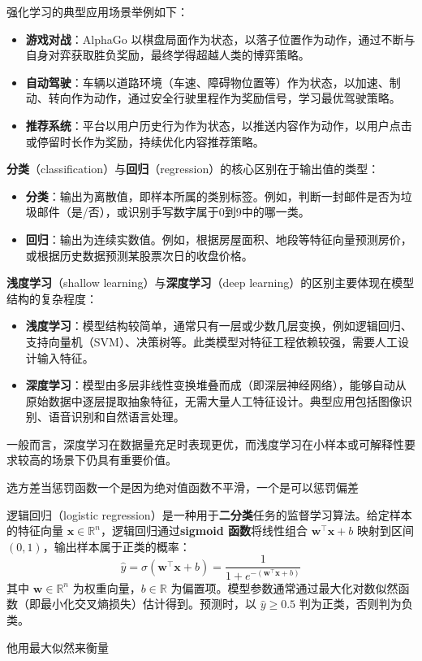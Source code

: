 \begin{note}
强化学习的典型应用场景举例如下：
\begin{itemize}
    \item \textbf{游戏对战}：AlphaGo 以棋盘局面作为状态，以落子位置作为动作，通过不断与自身对弈获取胜负奖励，最终学得超越人类的博弈策略。
    \item \textbf{自动驾驶}：车辆以道路环境（车速、障碍物位置等）作为状态，以加速、制动、转向作为动作，通过安全行驶里程作为奖励信号，学习最优驾驶策略。
    \item \textbf{推荐系统}：平台以用户历史行为作为状态，以推送内容作为动作，以用户点击或停留时长作为奖励，持续优化内容推荐策略。
\end{itemize}
\end{note}
\begin{note}
\textbf{分类}（classification）与\textbf{回归}（regression）的核心区别在于输出值的类型：
\begin{itemize}
    \item \textbf{分类}：输出为离散值，即样本所属的类别标签。例如，判断一封邮件是否为垃圾邮件（是/否），或识别手写数字属于0到9中的哪一类。
    \item \textbf{回归}：输出为连续实数值。例如，根据房屋面积、地段等特征向量预测房价，或根据历史数据预测某股票次日的收盘价格。
\end{itemize}
\end{note}

\begin{note}
\textbf{浅度学习}（shallow learning）与\textbf{深度学习}（deep learning）的区别主要体现在模型结构的复杂程度：
\begin{itemize}
    \item \textbf{浅度学习}：模型结构较简单，通常只有一层或少数几层变换，例如逻辑回归、支持向量机（SVM）、决策树等。此类模型对特征工程依赖较强，需要人工设计输入特征。
    \item \textbf{深度学习}：模型由多层非线性变换堆叠而成（即深层神经网络），能够自动从原始数据中逐层提取抽象特征，无需大量人工特征设计。典型应用包括图像识别、语音识别和自然语言处理。
\end{itemize}
一般而言，深度学习在数据量充足时表现更优，而浅度学习在小样本或可解释性要求较高的场景下仍具有重要价值。
\end{note}
\begin{dxtips}
  选方差当惩罚函数一个是因为绝对值函数不平滑，一个是可以惩罚偏差  
\end{dxtips}
\begin{definition}
逻辑回归（logistic regression）是一种用于\textbf{二分类}任务的监督学习算法。给定样本的特征向量 $\boldsymbol{x} \in \mathbb{R}^n$，逻辑回归通过\textbf{sigmoid 函数}将线性组合 $\boldsymbol{w}^\top \boldsymbol{x} + b$ 映射到区间 $(0,1)$，输出样本属于正类的概率：
\[
\hat{y} = \sigma(\boldsymbol{w}^\top \boldsymbol{x} + b) = \frac{1}{1 + e^{-(\boldsymbol{w}^\top \boldsymbol{x} + b)}}
\]
其中 $\boldsymbol{w} \in \mathbb{R}^n$ 为权重向量，$b \in \mathbb{R}$ 为偏置项。模型参数通常通过最大化对数似然函数（即最小化交叉熵损失）估计得到。预测时，以 $\hat{y} \geq 0.5$ 判为正类，否则判为负类。
\end{definition}
\begin{note}
    他用最大似然来衡量
\end{note}